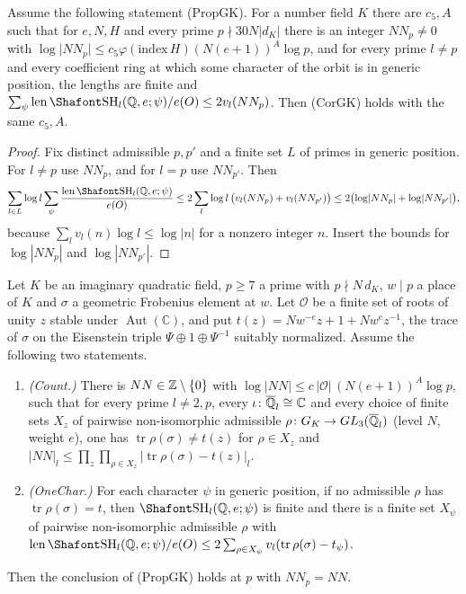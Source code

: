 \begin{proposition}\label{w4:prop:prop2cor}
Assume the following statement (PropGK). For a number field $K$ there are $c_5,A$ such that for $e,N,H$ and every prime $p\nmid30N\lvert d_K\rvert$ there is an integer $NN_p\ne0$ with $\log\lvert NN_p\rvert\le c_5\varphi(\mathrm{index}\,H)(N(e+1))^A\log p$, and for every prime $l\ne p$ and every coefficient ring at which some character of the orbit is in generic position, the lengths are finite and $\sum_\psi\len\Sha_l(\Q,e;\psi)/e(O)\le2v_l(NN_p)$. Then (CorGK) holds with the same $c_5,A$.
\end{proposition}

\begin{proof}
Fix distinct admissible $p,p'$ and a finite set $L$ of primes in generic position. For $l\ne p$ use $NN_p$, and for $l=p$ use $NN_{p'}$. Then
\[
\sum_{l\in L}\log l\sum_\psi\frac{\len\Sha_l(\Q,e;\psi)}{e(O)}\le2\sum_l\log l\,\bigl(v_l(NN_p)+v_l(NN_{p'})\bigr)\le2\bigl(\log\lvert NN_p\rvert+\log\lvert NN_{p'}\rvert\bigr),
\]
because $\sum_lv_l(n)\log l\le\log|n|$ for a nonzero integer $n$. Insert the bounds for $\log|NN_p|$ and $\log|NN_{p'}|$.
\end{proof}

\begin{proposition}\label{w4:prop:onechar2prop}
Let $K$ be an imaginary quadratic field, $p\ge7$ a prime with $p\nmid N\,d_K$, $w\mid p$ a place of $K$ and $\sigma$ a geometric Frobenius element at $w$. Let $\mathcal O$ be a finite set of roots of unity $z$ stable under $\operatorname{Aut}(\mathbb C)$, and put $t(z)=Nw^{-e}z+1+Nw^{e}z^{-1}$, the trace of $\sigma$ on the Eisenstein triple $\Psi\oplus1\oplus\Psi^{-1}$ suitably normalized. Assume the following two statements.
\begin{enumerate}[leftmargin=*,label=(\alph*)]
\item \emph{(Count.)} There is $NN\in\mathbb Z\setminus\{0\}$ with $\log|NN|\le c\,|\mathcal O|\,(N(e+1))^A\log p$, such that for every prime $l\ne2,p$, every $\iota\colon\overline{\mathbb Q}_l\cong\mathbb C$ and every choice of finite sets $X_z$ of pairwise non-isomorphic admissible $\rho\colon G_K\to GL_3(\overline{\mathbb Q}_l)$ (level $N$, weight $e$), one has $\operatorname{tr}\rho(\sigma)\ne t(z)$ for $\rho\in X_z$ and $\lvert NN\rvert_l\le\prod_z\prod_{\rho\in X_z}\lvert\operatorname{tr}\rho(\sigma)-t(z)\rvert_l$.
\item \emph{(OneChar.)} For each character $\psi$ in generic position, if no admissible $\rho$ has $\operatorname{tr}\rho(\sigma)=t$, then $\Sha_l(\Q,e;\psi)$ is finite and there is a finite set $X_\psi$ of pairwise non-isomorphic admissible $\rho$ with $\len\Sha_l(\Q,e;\psi)/e(O)\le2\sum_{\rho\in X_\psi}v_l(\operatorname{tr}\rho(\sigma)-t_\psi)$.
\end{enumerate}
Then the conclusion of (PropGK) holds at $p$ with $NN_p=NN$.
\end{proposition}

